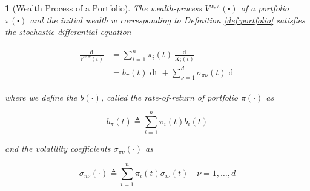 \documentclass[british]{amsart}
\numberwithin{equation}{section}
\numberwithin{figure}{section}
\theoremstyle{plain}
\newtheorem{thm}{\protect\theoremname}[section]
\theoremstyle{definition}
\theoremstyle{plain}
\theoremstyle{plain}
\theoremstyle{plain}
\theoremstyle{remark}
\theoremstyle{plain}
\providecommand{\theoremname}{Theorem}
\renewcommand{\d}[1]{\mathop{\mathrm{d}{#1}}}
\newcommand{\defeq}{\mathop{\triangleq}}
\begin{document}
\begin{thm} [Wealth Process of a Portfolio]

  The wealth-process $V^{w,\pi}(\centerdot)$ of a portfolio $\pi(\centerdot)$
and the initial wealth $w$ corresponding to Definition \ref{def:portfolio}
satisfies the stochastic differential equation

  \begin{gather} \label{eq:wealthprocess} \begin{split}
\frac{\d{V^{w,\pi}(t)}}{V^{w,\pi}(t)} &= \sum_{i=1}^{n} \pi_{i}(t)
\frac{\d{X_{i}(t)}}{X_{i}(t)} \\ &= b_{\pi}(t)\d{t} + \sum_{\nu=1}^{d}
\sigma_{\pi\nu}(t) \d{W_{\nu}(t)} \end{split} \end{gather}

  where we define the $b(\cdot)$, called the rate-of-return of portfolio
$\pi(\cdot)$ as

  \begin{equation} \label{eq:bpi} b_{\pi}(t) \defeq \sum_{i=1}^{n} \pi_{i}(t)
b_{i}(t) \end{equation}

  and the volatility coefficients $\sigma_{\pi\nu}(\cdot)$ as

  \begin{equation} \label{eq:sigmapi} \sigma_{\pi\nu}(\cdot) \defeq
\sum_{i=1}^{n} \pi_{i}(t) \sigma_{i\nu}(t) \quad \nu=1,\dots,d \end{equation}

\end{thm}
\end{document}
